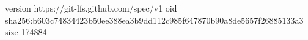 version https://git-lfs.github.com/spec/v1
oid sha256:b603c74834423b50ee388ea3b9dd112c985f647870b90a8de5657f26885133a3
size 174884
